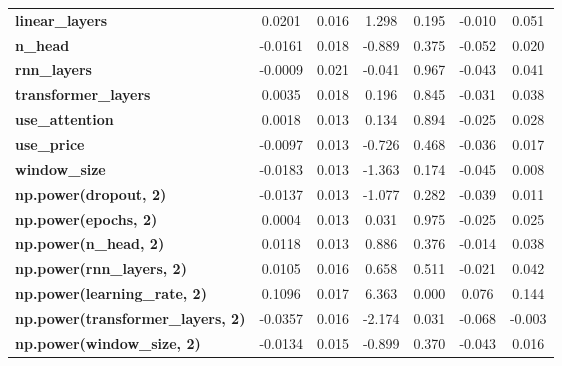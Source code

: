 \begin{center}
\begin{tabular}{lcccccc}
\textbf{linear\_layers}                   &       0.0201  &        0.016     &     1.298  &         0.195        &       -0.010    &        0.051     \\
\textbf{n\_head}                          &      -0.0161  &        0.018     &    -0.889  &         0.375        &       -0.052    &        0.020     \\
\textbf{rnn\_layers}                      &      -0.0009  &        0.021     &    -0.041  &         0.967        &       -0.043    &        0.041     \\
\textbf{transformer\_layers}              &       0.0035  &        0.018     &     0.196  &         0.845        &       -0.031    &        0.038     \\
\textbf{use\_attention}                   &       0.0018  &        0.013     &     0.134  &         0.894        &       -0.025    &        0.028     \\
\textbf{use\_price}                       &      -0.0097  &        0.013     &    -0.726  &         0.468        &       -0.036    &        0.017     \\
\textbf{window\_size}                     &      -0.0183  &        0.013     &    -1.363  &         0.174        &       -0.045    &        0.008     \\
\textbf{np.power(dropout, 2)}             &      -0.0137  &        0.013     &    -1.077  &         0.282        &       -0.039    &        0.011     \\
\textbf{np.power(epochs, 2)}              &       0.0004  &        0.013     &     0.031  &         0.975        &       -0.025    &        0.025     \\
\textbf{np.power(n\_head, 2)}             &       0.0118  &        0.013     &     0.886  &         0.376        &       -0.014    &        0.038     \\
\textbf{np.power(rnn\_layers, 2)}         &       0.0105  &        0.016     &     0.658  &         0.511        &       -0.021    &        0.042     \\
\textbf{np.power(learning\_rate, 2)}      &       0.1096  &        0.017     &     6.363  &         0.000        &        0.076    &        0.144     \\
\textbf{np.power(transformer\_layers, 2)} &      -0.0357  &        0.016     &    -2.174  &         0.031        &       -0.068    &       -0.003     \\
\textbf{np.power(window\_size, 2)}        &      -0.0134  &        0.015     &    -0.899  &         0.370        &       -0.043    &        0.016     \\

\end{tabular}
\end{center}
